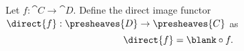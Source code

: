 \begin{definition}
Let $f : \cat{C}\rightarrow \cat{D}$.
Define the direct image functor 
$\direct{f}: \presheaves{D} \rightarrow \presheaves{C}$
as \[ \direct{f} = \blank \circ f.\]
\end{definition}